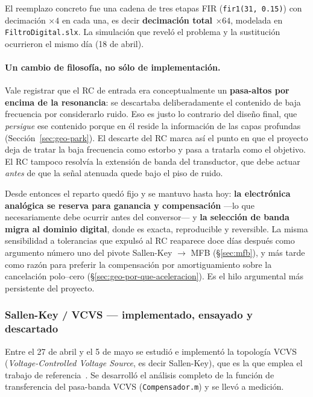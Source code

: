 El reemplazo concreto fue una cadena de tres etapas FIR (\texttt{fir1(31, 0.15)}) con
decimaci\'on $\times 4$ en cada una, es decir \textbf{decimaci\'on total $\times 64$},
modelada en \texttt{FiltroDigital.slx}. La simulaci\'on que revel\'o el problema y la
sustituci\'on ocurrieron el mismo d\'ia (18 de abril).

\paragraph{Un cambio de filosof\'ia, no s\'olo de implementaci\'on.} Vale registrar que el
RC de entrada era conceptualmente un \textbf{pasa-altos por encima de la resonancia}: se
descartaba deliberadamente el contenido de baja frecuencia por considerarlo ruido. Eso es
justo lo contrario del dise\~no final, que \emph{persigue} ese contenido porque en \'el
reside la informaci\'on de las capas profundas (Secci\'on~\ref{sec:geo-park}). El descarte
del RC marca as\'i el punto en que el proyecto deja de tratar la baja frecuencia como
estorbo y pasa a tratarla como el objetivo. El RC tampoco resolv\'ia la extensi\'on de
banda del transductor, que debe actuar \emph{antes} de que la se\~nal atenuada quede bajo
el piso de ruido.

Desde entonces el reparto qued\'o fijo y se mantuvo hasta hoy: \textbf{la electr\'onica
anal\'ogica se reserva para ganancia y compensaci\'on} ---lo que necesariamente debe
ocurrir antes del conversor--- y \textbf{la selecci\'on de banda migra al dominio
digital}, donde es exacta, reproducible y reversible. La misma sensibilidad a tolerancias
que expuls\'o al RC reaparece doce d\'ias despu\'es como argumento n\'umero uno del pivote
Sallen-Key $\to$ MFB (\S\ref{sec:mfb}), y m\'as tarde como raz\'on para preferir la
compensaci\'on por amortiguamiento sobre la cancelaci\'on polo--cero
(\S\ref{sec:geo-por-que-aceleracion}). Es el hilo argumental m\'as persistente del
proyecto.

\subsubsection{Sallen-Key / VCVS --- implementado, ensayado y descartado}

Entre el 27 de abril y el 5 de mayo se estudi\'o e implement\'o la topolog\'ia VCVS
(\emph{Voltage-Controlled Voltage Source}, es decir Sallen-Key), que es la que emplea el
trabajo de referencia~\cite{Ma2023}. Se desarroll\'o el an\'alisis completo de la funci\'on
de transferencia del pasa-banda VCVS (\texttt{Compensador.m}) y se llev\'o a medici\'on.

